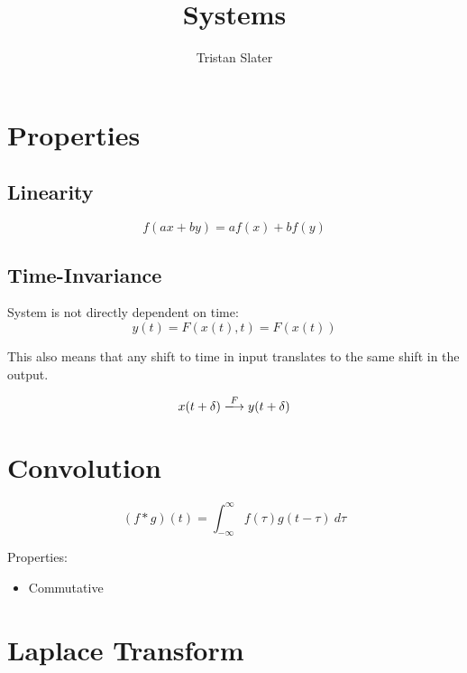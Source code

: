 \documentclass{article}
\title{Systems}
\author{Tristan Slater}
\begin{document}
    \maketitle

    \section{Properties}

    \subsection{Linearity}

    \begin{equation}
        f(ax + by) = af(x) + bf(y)
    \end{equation}

    \subsection{Time-Invariance}

    System is not directly dependent on time: \begin{equation}
        y(t) = F(x(t), t) = F(x(t))
    \end{equation}

    This also means that any shift to time in input translates to the same shift in the output.

    \begin{equation}
        x(t + \delta) \xlongrightarrow{F} y(t + \delta)
    \end{equation}

    \section{Convolution}

    \begin{equation}
        (f * g)(t) = \int_{-\infty}^\infty{f(\tau)g(t - \tau)\ d\tau}
    \end{equation}

    Properties: \begin{itemize}
        \item Commutative
    \end{itemize}

    \section{Laplace Transform}
\end{document}
